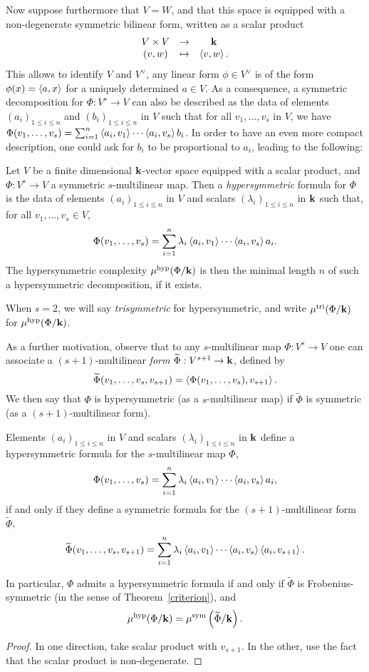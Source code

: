\documentclass[11pt]{article}
\begin{document}
Now suppose furthermore that $V=W$, and that this space is equipped with a
non-degenerate symmetric bilinear form, written as a scalar product
\[
\begin{array}{ccc}
V\times V &\to&\mathbf{k}\\
(v,w)&\mapsto&\left\langle v,w\right\rangle.
\end{array}
\]
This allows to identify $V$ and $V^\vee$, \ie any linear form $\phi\in V^\vee$
is of the form $\phi(x)=\left\langle a,x\right\rangle$ for a uniquely determined $a\in V$.
As a consequence, a symmetric decomposition for $\Phi:V^s\to V$ can also be described
as the data of elements $(a_i)_{1\leq i\leq n}$ and $(b_i)_{1\leq i\leq n}$ in $V$
such that for all $v_1,\dots,v_s$ in $V$,
we have $\Phi(v_1,\dots,v_s)=\sum_{i=1}^{n}\left\langle a_i,v_1\right\rangle\cdots\left\langle a_i,v_s\right\rangle b_i$.
In order to have an even more compact description, one could ask for $b_i$ to be proportional to $a_i$, leading to the following:
\begin{defi}
Let $V$ be a finite dimensional $\mathbf{k}$-vector space equipped with a scalar product,
and $\Phi:V^s\to V$ a symmetric $s$-multilinear map.
Then a \emph{hypersymmetric} formula for $\Phi$ is the data of
elements $(a_i)_{1\leq i\leq n}$ in $V$ and scalars $(\lambda_i)_{1\leq i\leq n}$ in $\mathbf{k}$ such that, for all $v_1,\dots,v_s\in V$,
\[
\Phi(v_1,\dots,v_s)=\sum_{i=1}^{n}\lambda_i\left\langle a_i,v_1\right\rangle\cdots\left\langle a_i,v_s\right\rangle a_i.
\]
The hypersymmetric complexity $\mu^{\text{hyp}}(\Phi/\mathbf{k})$ is then the minimal length $n$ of such a hypersymmetric decomposition, if it exists.

When $s=2$, we will say \emph{trisymmetric} for hypersymmetric,
and write $\mu^{\text{tri}}(\Phi/\mathbf{k})$ for $\mu^{\text{hyp}}(\Phi/\mathbf{k})$.
\end{defi}
As a further motivation, observe that to any $s$-multilinear map $\Phi:V^s\to V$
one can associate a $(s+1)$-multilinear \emph{form} $\widetilde{\Phi}:V^{s+1}\to \mathbf{k}$, defined by
\[
\widetilde{\Phi}(v_1,\dots,v_s,v_{s+1})=\left\langle\Phi(v_1,\dots,v_s),v_{s+1}\right\rangle.
\]
We then say that $\Phi$ is hypersymmetric (as a $s$-multilinear map)
if $\widetilde{\Phi}$ is symmetric (as a $(s+1)$-multilinear form).
\begin{lm}
Elements $(a_i)_{1\leq i\leq n}$ in $V$ and scalars $(\lambda_i)_{1\leq i\leq n}$ in $\mathbf{k}$ define a hypersymmetric formula for the $s$-multilinear map $\Phi$,
\[
\Phi(v_1,\dots,v_s)=\sum_{i=1}^{n}\lambda_i\left\langle a_i,v_1\right\rangle\cdots\left\langle a_i,v_s\right\rangle a_i,
\]
if and only if they define a symmetric formula for the $(s+1)$-multilinear form $\widetilde{\Phi}$,
\[
\widetilde{\Phi}(v_1,\dots,v_s,v_{s+1})=\sum_{i=1}^{n}\lambda_i\left\langle a_i,v_1\right\rangle\cdots\left\langle a_i,v_s\right\rangle\left\langle a_i,v_{s+1}\right\rangle.
\]

In particular, $\Phi$ admits a hypersymmetric formula if and only if $\widetilde{\Phi}$ is Frobenius-symmetric (in the sense of Theorem~\ref{criterion}),
and
\[
\mu^{\text{hyp}}(\Phi/\mathbf{k})=\mu^{\text{sym}}\left(\widetilde{\Phi}/\mathbf{k}\right).
\]
\end{lm}
\begin{proof}
In one direction, take scalar product with $v_{s+1}$. In the other, use the fact that the scalar product is non-degenerate.
\end{proof}
\end{document}
